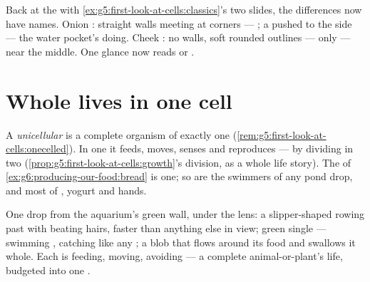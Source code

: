 \begin{example}\label{ex:g6:cell-unit-of-life:slides}
Back at the  with
\cref{ex:g5:first-look-at-cells:classics}'s two slides, the
differences now have names. Onion : straight walls
meeting at corners --- ; a  pushed to the
side --- the water pocket's doing. Cheek : no walls,
soft rounded outlines ---  only ---  near
the middle. One glance now reads  or .
\end{example}

\section{Whole lives in one cell}

\begin{definition}\label{def:g6:cell-unit-of-life:unicellular}
A \emph{unicellular}  is a
complete organism of exactly one 
(\cref{rem:g5:first-look-at-cells:onecelled}). In one
 it feeds, moves, senses and reproduces --- by
dividing in two
(\cref{prop:g5:first-look-at-cells:growth}'s division, as a
whole life story). The  of
\cref{ex:g6:producing-our-food:bread} is one; so are the
swimmers of any pond drop, and most  of ,
yogurt and hands.
\end{definition}

\begin{example}\label{ex:g6:cell-unit-of-life:drop}
One drop from the aquarium's green wall, under the lens: a
slipper-shaped  rowing past with beating hairs, faster
than anything else in view; green single  --- swimming
, catching  like any ; a blob that flows
around its food and swallows it whole. Each is feeding,
moving, avoiding --- a complete animal-or-plant's life,
budgeted into one .
\end{example}

